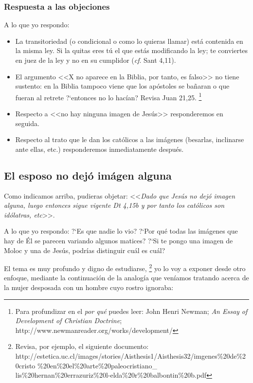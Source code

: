 \documentclass{article}
\begin{document}
\subsubsection{Respuesta a las objeciones}

A lo que yo respondo:

\begin{itemize}
\item La transitoriedad (o condicional o como lo quieras llamar) est\'a contenida en la misma ley. Si la quitas eres t\'u el que est\'as modificando la ley; te conviertes en juez de la ley y no en su cumplidor (\emph{cf}. Sant 4,11).
\item El argumento <<X no aparece en la Biblia, por tanto, es falso>> no tiene sustento: en la Biblia tampoco viene que los ap\'ostoles se ba\~naran o que fueran al retrete ?`entonces no lo hac\'{i}an? Revisa Juan 21,25.%
    \footnote{Para profundizar en el \emph{por qu\'e} puedes leer: John Henri Newman; \emph{An Essay of Development of Christian Doctrine}; http://www.newmanreader.org/works/development/}
\item Respecto a <<no hay ninguna imagen de Jes\'us>> responderemos en seguida.
\item Respecto al trato que le dan los cat\'olicos a las im\'agenes (besarlas, inclinarse ante ellas, etc.) responderemos inmediatamente despu\'es.
\end{itemize}

\subsection{El esposo no dej\'o im\'agen alguna}

Como indicamos arriba, pudieras objetar: <<\emph{Dado que Jes\'us no dej\'o imagen alguna, luego entonces sigue vigente Dt 4,15b y por tanto los cat\'olicos son id\'olatras, etc}>>.

A lo que yo respondo: ?`Es que nadie lo vio? ?`Por qu\'e todas las im\'agenes que hay de \'El se parecen variando algunos matices? ?`Si te pongo una imagen de Moloc y una de Jes\'us, podr\'{i}as distinguir cu\'al es cu\'al?

El tema es muy profundo y digno de estudiarse,%
    \footnote{Revisa, por ejemplo, el siguiente documento:\\
    http://estetica.uc.cl/images/stories/Aisthesis1/Aisthesis32/imgenes\%20de\%20cristo
    \%20en\%20el\%20arte\%20paleocristiano\_\\
    lis\%20hernan\%20errazuriz\%20l-elda\%20r\%20balbontin\%20b.pdf}
yo lo voy a exponer desde otro enfoque, mediante la continuaci\'on de la analog\'{i}a que ven\'{i}amos tratando acerca de la mujer desposada con un hombre cuyo rostro ignoraba:
\end{document}
